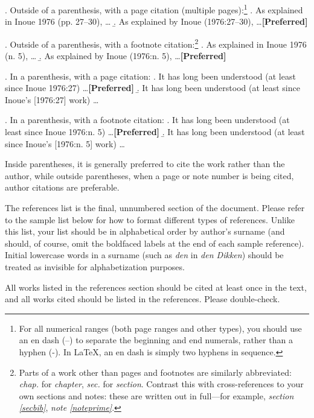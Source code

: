 \documentclass[letterpaper,12pt, twoside]{article}
\begin{document}
\ex. Outside of a parenthesis, with a page citation (multiple pages):\footnote{For all numerical ranges (both page ranges and other types), you should use an en dash (--) to separate the beginning and end numerals, rather than a hyphen (-). In LaTeX, an en dash is simply two hyphens in sequence. }
\a. As explained in Inoue 1976 (pp. 27--30), \ldots
\b. As explained by Inoue (1976:27--30), \ldots 	 {\footnotesize\bfseries \hfill [Preferred]}

\ex. Outside of a parenthesis, with a footnote citation:\footnote{Parts of a work other than pages and footnotes are similarly abbreviated: \emph{chap.} for \emph{chapter}, \emph{sec.} for \emph{section}. Contrast  this with cross-references to your own sections and notes: these are written out in full---for example, \emph{section \ref{secbib}}, \emph{note \ref{noteprime}}.}
\a. As explained in Inoue 1976 (n. 5), \ldots
\b. As explained by Inoue (1976:n. 5), \ldots	 {\footnotesize\bfseries \hfill [Preferred]}

\ex. In a parenthesis, with a page citation:
\a. It has long been understood (at least since Inoue 1976:27) \ldots  {\footnotesize\bfseries \hfill [Preferred]}
\b. It has long been understood (at least since Inoue's [1976:27] work) \ldots 

\ex. In a parenthesis, with a footnote citation:
\a. It has long been understood (at least since Inoue 1976:n. 5) \ldots {\footnotesize\bfseries \hfill [Preferred]}
\b. It has long been understood (at least since Inoue's [1976:n. 5] work) \ldots   

Inside parentheses, it is generally preferred to cite the work rather than the author, while outside parentheses, when a page or note number is being cited, author citations are preferable.

The references list is the final, unnumbered section of the document. Please refer to the sample list below for how to format different types of references. Unlike this list, your list should be in alphabetical order by author's surname (and should, of course, omit the boldfaced labels at the end of each sample reference). Initial lowercase words in a surname (such as \emph{den} in \emph{den Dikken}) should be treated as invisible for alphabetization purposes.

All works listed in the references section should be cited at least once in the text, and all works cited should be listed in the references. Please double-check. 



\end{document}
